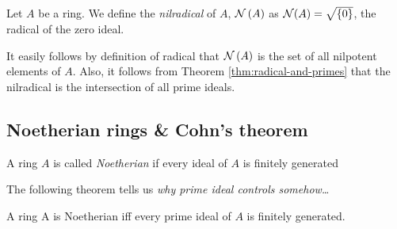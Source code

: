 \begin{definition}[nilradical]
    Let $A$ be a ring. We define the \textit{nilradical} of $A$, ${\cal N} \left( A \right)$ as ${\cal N} (A) = \sqrt{ \left\{ 0 \right\}}$, the radical of the zero ideal.
    \label{def:nilradical}
\end{definition}

\begin{remark}
    It easily follows by definition of radical that ${\cal N} \left( A \right)$ is the set of all nilpotent elements of $A$.
    Also, it follows from Theorem \ref{thm:radical-and-primes} that the nilradical is the intersection of all prime ideals.
    \label{rem:nilradical}
\end{remark}

\subsection{Noetherian rings \& Cohn's theorem}

\begin{definition}
    A ring $A$ is called \textit{Noetherian} if every ideal of $A$ is finitely generated
    \label{def:Noetherian-ring}
\end{definition}

The following theorem tells us \emph{why prime ideal controls somehow\ldots}

\begin{theorem}
    A ring A is Noetherian iff every prime ideal of $A$ is finitely generated.
    \label{thm:cohn}
\end{theorem}



